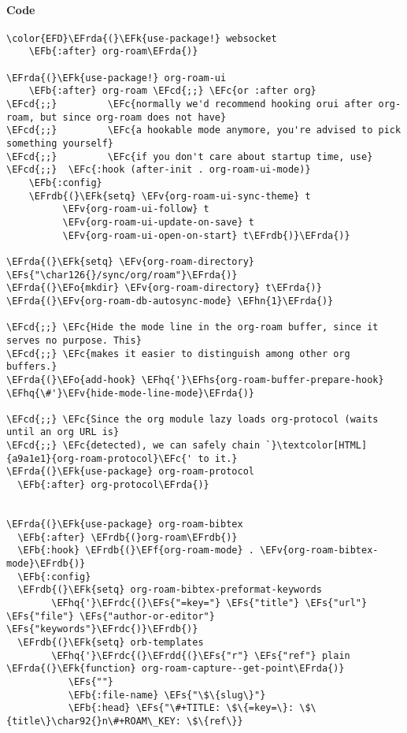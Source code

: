 \documentclass[a4wide,10pt]{article}
\newcommand{\EFc}[1]{\textcolor{EFc}{#1}} %
\newcommand{\EFcd}[1]{\textcolor{EFcd}{#1}} %
\newcommand{\EFs}[1]{\textcolor{EFs}{#1}} %
\newcommand{\EFk}[1]{\textcolor{EFk}{#1}} %
\newcommand{\EFb}[1]{\textcolor{EFb}{#1}} %
\newcommand{\EFf}[1]{\textcolor{EFf}{#1}} %
\newcommand{\EFv}[1]{\textcolor{EFv}{#1}} %
\newcommand{\EFo}[1]{\textcolor{EFo}{#1}} %
\newcommand{\EFhn}[1]{\textcolor{EFhn}{\textbf{#1}}} %
\newcommand{\EFhq}[1]{\textcolor{EFhq}{#1}} %
\newcommand{\EFhs}[1]{\textcolor{EFhs}{#1}} %
\newcommand{\EFrda}[1]{\textcolor{EFrda}{#1}} %
\newcommand{\EFrdb}[1]{\textcolor{EFrdb}{#1}} %
\newcommand{\EFrdc}[1]{\textcolor{EFrdc}{#1}} %
\newcommand{\EFrdd}[1]{\textcolor{EFrdd}{#1}} %
\begin{document}
\paragraph{Code}
\label{sec:orga255882}
\begin{Code}
\begin{Verbatim}
\color{EFD}\EFrda{(}\EFk{use-package!} websocket
    \EFb{:after} org-roam\EFrda{)}

\EFrda{(}\EFk{use-package!} org-roam-ui
    \EFb{:after} org-roam \EFcd{;;} \EFc{or :after org}
\EFcd{;;}         \EFc{normally we'd recommend hooking orui after org-roam, but since org-roam does not have}
\EFcd{;;}         \EFc{a hookable mode anymore, you're advised to pick something yourself}
\EFcd{;;}         \EFc{if you don't care about startup time, use}
\EFcd{;;}  \EFc{:hook (after-init . org-roam-ui-mode)}
    \EFb{:config}
    \EFrdb{(}\EFk{setq} \EFv{org-roam-ui-sync-theme} t
          \EFv{org-roam-ui-follow} t
          \EFv{org-roam-ui-update-on-save} t
          \EFv{org-roam-ui-open-on-start} t\EFrdb{)}\EFrda{)}

\EFrda{(}\EFk{setq} \EFv{org-roam-directory} \EFs{"\char126{}/sync/org/roam"}\EFrda{)}
\EFrda{(}\EFo{mkdir} \EFv{org-roam-directory} t\EFrda{)}
\EFrda{(}\EFv{org-roam-db-autosync-mode} \EFhn{1}\EFrda{)}

\EFcd{;;} \EFc{Hide the mode line in the org-roam buffer, since it serves no purpose. This}
\EFcd{;;} \EFc{makes it easier to distinguish among other org buffers.}
\EFrda{(}\EFo{add-hook} \EFhq{'}\EFhs{org-roam-buffer-prepare-hook} \EFhq{\#'}\EFv{hide-mode-line-mode}\EFrda{)}

\EFcd{;;} \EFc{Since the org module lazy loads org-protocol (waits until an org URL is}
\EFcd{;;} \EFc{detected), we can safely chain `}\textcolor[HTML]{a9a1e1}{org-roam-protocol}\EFc{' to it.}
\EFrda{(}\EFk{use-package} org-roam-protocol
  \EFb{:after} org-protocol\EFrda{)}


\EFrda{(}\EFk{use-package} org-roam-bibtex
  \EFb{:after} \EFrdb{(}org-roam\EFrdb{)}
  \EFb{:hook} \EFrdb{(}\EFf{org-roam-mode} . \EFv{org-roam-bibtex-mode}\EFrdb{)}
  \EFb{:config}
  \EFrdb{(}\EFk{setq} org-roam-bibtex-preformat-keywords
        \EFhq{'}\EFrdc{(}\EFs{"=key="} \EFs{"title"} \EFs{"url"} \EFs{"file"} \EFs{"author-or-editor"} \EFs{"keywords"}\EFrdc{)}\EFrdb{)}
  \EFrdb{(}\EFk{setq} orb-templates
        \EFhq{'}\EFrdc{(}\EFrdd{(}\EFs{"r"} \EFs{"ref"} plain \EFrda{(}\EFk{function} org-roam-capture--get-point\EFrda{)}
           \EFs{""}
           \EFb{:file-name} \EFs{"\$\{slug\}"}
           \EFb{:head} \EFs{"\#+TITLE: \$\{=key=\}: \$\{title\}\char92{}n\#+ROAM\_KEY: \$\{ref\}}


\end{Verbatim}
\end{Code}
\end{document}
